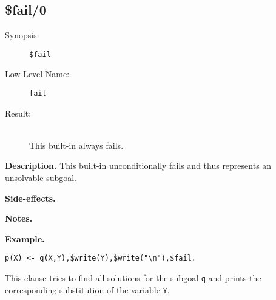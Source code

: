 %
%
%
\subsection{\$fail/0}

\begin{description}
\item[Synopsis:]
	{\tt \$fail}
\item[Low Level Name:]
	{\tt fail }
\item[Result:]\ \\
This built-in always fails.
\end{description}

\vspace*{0.5cm}
\noindent
{\bf Description.}
This built-in unconditionally fails and thus represents an
unsolvable subgoal.

\vspace*{0.5cm}
\noindent
{\bf Side-effects.}

\vspace*{0.5cm}
\noindent
{\bf Notes.}

\vspace*{0.5cm}
\noindent
{\bf Example.}
\begin{verbatim}
p(X) <- q(X,Y),$write(Y),$write("\n"),$fail.
\end{verbatim}

This clause tries to find all solutions for the subgoal {\tt q} and
prints the corresponding substitution of the variable {\tt Y}.


